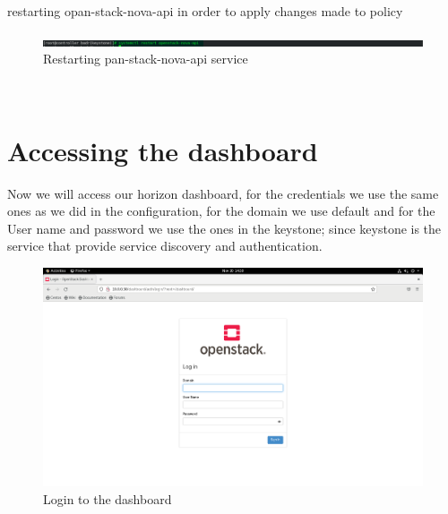 \begin{spacing}{1.2}
\par restarting opan-stack-nova-api in order to apply changes made to policy
\\
\begin{figure}[!htb] 
\begin{center} 
\includegraphics[width=1\linewidth]{Cloud/Configure Horizon/C_6.png} 
\end{center} 
\caption{ Restarting pan-stack-nova-api service} 
\end{figure} 
\FloatBarrier
\\
\newpage
\section{Accessing the dashboard}
\par Now we will access our horizon dashboard, for the credentials we use the same ones as we did in the configuration, for the domain we use default and for the User name and password we use the ones in the keystone; since keystone is the service that provide service discovery and authentication.
\\
\begin{figure}[!htb] 
\begin{center} 
\includegraphics[width=1\linewidth]{Cloud/Configure Horizon/C_7.png} 
\end{center} 
\caption{  Login to the dashboard} 
\end{figure} 
\FloatBarrier
\\


\end{spacing}
